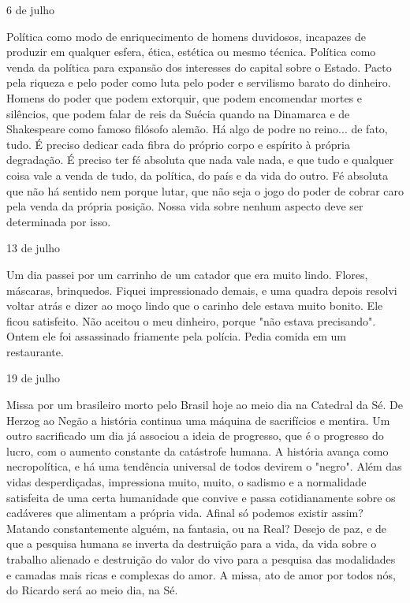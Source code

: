 \begin{flushright}
6 de julho
\end{flushright}

Política como modo de enriquecimento de homens duvidosos, incapazes de
produzir em qualquer esfera, ética, estética ou mesmo técnica. Política
como venda da política para expansão dos interesses do capital sobre o
Estado. Pacto pela riqueza e pelo poder como luta pelo poder e
servilismo barato do dinheiro. Homens do poder que podem extorquir, que
podem encomendar mortes e silêncios, que podem falar de reis da Suécia
quando na Dinamarca e de Shakespeare como famoso filósofo alemão. Há
algo de podre no reino... de fato, tudo. É preciso dedicar cada fibra do
próprio corpo e espírito à própria degradação. É preciso ter fé absoluta
que nada vale nada, e que tudo e qualquer coisa vale a venda de tudo, da
política, do país e da vida do outro. Fé absoluta que não há sentido nem
porque lutar, que não seja o jogo do poder de cobrar caro pela venda da
própria posição. Nossa vida sobre nenhum aspecto deve ser determinada
por isso.

\begin{flushright}
13 de julho
\end{flushright}

Um dia passei por um carrinho de um catador que era muito lindo. Flores,
máscaras, brinquedos. Fiquei impressionado demais, e uma quadra depois
resolvi voltar atrás e dizer ao moço lindo que o carinho dele estava
muito bonito. Ele ficou satisfeito. Não aceitou o meu dinheiro, porque
"não estava precisando". Ontem ele foi assassinado friamente pela
polícia. Pedia comida em um restaurante.

\begin{flushright}
19 de julho
\end{flushright}

Missa por um brasileiro morto pelo Brasil hoje ao meio dia na Catedral
da Sé. De Herzog ao Negão a história continua uma máquina de sacrifícios
e mentira. Um outro sacrificado um dia já associou a ideia de progresso,
que é o progresso do lucro, com o aumento constante da catástrofe
humana. A história avança como necropolítica, e há uma tendência
universal de todos devirem o "negro". Além das vidas desperdiçadas,
impressiona muito, muito, o sadismo e a normalidade satisfeita de uma
certa humanidade que convive e passa cotidianamente sobre os cadáveres
que alimentam a própria vida. Afinal só podemos existir assim? Matando
constantemente alguém, na fantasia, ou na Real? Desejo de paz, e de que
a pesquisa humana se inverta da destruição para a vida, da vida sobre o
trabalho alienado e destruição do valor do vivo para a pesquisa das
modalidades e camadas mais ricas e complexas do amor. A missa, ato de
amor por todos nós, do Ricardo será ao meio dia, na Sé.


